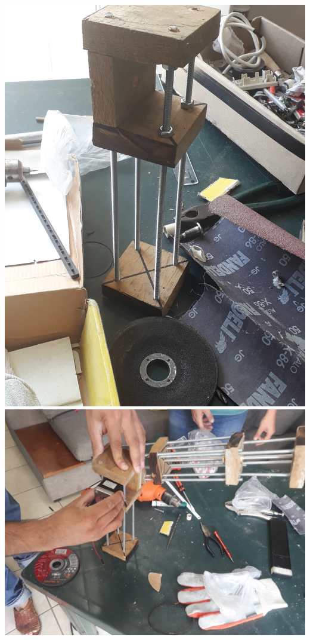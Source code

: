 \documentclass[11pt,a4paper,oldfontcommands,oneside]{memoir}
\begin{document}
\begin{center}
\includegraphics[scale=0.05]{6.jpg} \\
\includegraphics[scale=0.05]{7.jpg} \\

\end{center}
\end{document}
